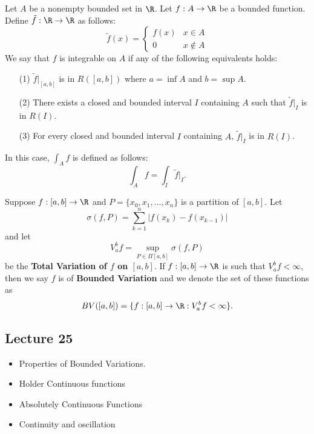 \begin{remark}
    Let \( A  \) be a nonempty bounded set in \( \R  \). Let \( f: A \to \R  \) be a bounded function. Define \( \tilde{f} : \R \to \R  \) as follows: 
    \[  \tilde{f}(x) = 
    \begin{cases}
        f(x) & x \in A  \\
        0 & x \notin A 
    \end{cases} \]
    We say that \( f  \) is integrable on \( A  \) if any of the following equivalents holds: 
    \begin{enumerate}
        \item[(1)] \( \tilde{f} \Big|_{[a,b]} \) is in \( R([a,b]) \) where \( a = \inf A  \) and \( b = \sup A  \).
        \item[(2)] There exists a closed and bounded interval \( I  \) containing \( A  \) such that \( \tilde{f} \Big|_{I} \) is in \( R(I) \).
        \item[(3)] For every closed and bounded interval \( I  \) containing \( A  \), \( \tilde{f} \Big|_{I} \) is in \( R(I) \).
    \end{enumerate}
    In this case, \( \int_{ A  } f   \) is defined as follows:
    \[  \int_{ A  } f  = \int_{ I  } \tilde{f} \Big|_{I}. \tag{where \( I  \) is any closed and bounded interval} \]
\end{remark}

\begin{definition}\label{Functions of bounded variation}
    Suppose \( f:[a,b] \to \R  \) and \( P = \{ {x}_{0}, {x}_{1}, \dots, {x}_{n} \}  \) is a partition of \( [a,b] \). Let 
    \[  \sigma(f,P) = \sum_{ k=1  }^{ n } | f({x}_{k}) - f({x}_{k-1}) |  \]
    and let 
    \[  {V}_{a}^{b} f = \sup_{P \in \Pi [a,b]} \sigma(f,P) \]
    be the \textbf{Total Variation of \( f  \) on \( [a,b] \)}. If \( f : [a,b] \to \R  \) is such that \( {V}_{a}^{b} f < \infty   \), then we say \( f  \) is of \textbf{Bounded Variation} and we denote the set of these functions as 
    \[  BV ([a,b]) = \{ f:[a,b] \to \R : {V}_{a}^{b} f < \infty  \}. \]
\end{definition}


\subsection{Lecture 25}

\begin{itemize}
    \item Properties of Bounded Variations.
    \item Holder Continuous functions
    \item Absolutely Continuous Functions
    \item Continuity and oscillation
\end{itemize}



